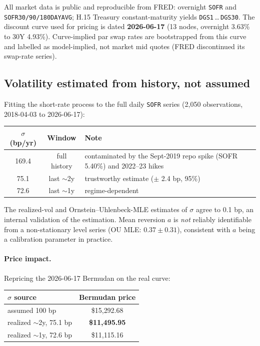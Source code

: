 \documentclass[11pt]{article}
\begin{document}
All market data is public and reproducible from FRED: overnight \texttt{SOFR} and
\texttt{SOFR30/90/180DAYAVG}; H.15 Treasury constant-maturity yields \texttt{DGS1}\,\ldots\,\texttt{DGS30}.
The discount curve used for pricing is dated \textbf{2026-06-17} (13 nodes, overnight
3.63\% to 30Y 4.93\%). Curve-implied par swap rates are bootstrapped from this curve and
labelled as model-implied, not market mid quotes (FRED discontinued its swap-rate series).

\subsection{Volatility estimated from history, not assumed}

Fitting the short-rate process to the full daily \texttt{SOFR} series (2{,}050 observations,
2018-04-03 to 2026-06-17):

\begin{center}
\begin{tabular}{ccl}
\toprule
$\sigma$ (bp/yr) & Window & Note \\
\midrule
169.4 & full history & contaminated by the Sept-2019 repo spike (SOFR 5.40\%) and 2022--23 hikes \\
75.1  & last $\sim$2y & trustworthy estimate ($\pm$ 2.4 bp, 95\%) \\
72.6  & last $\sim$1y & regime-dependent \\
\bottomrule
\end{tabular}
\end{center}

\noindent The realized-vol and Ornstein--Uhlenbeck-MLE estimates of $\sigma$ agree to
0.1 bp, an internal validation of the estimation. Mean reversion $a$ is \emph{not}
reliably identifiable from a non-stationary level series (OU MLE: $0.37 \pm 0.31$),
consistent with $a$ being a calibration parameter in practice.

\paragraph{Price impact.} Repricing the 2026-06-17 Bermudan on the real curve:

\begin{center}
\begin{tabular}{lc}
\toprule
$\sigma$ source & Bermudan price \\
\midrule
assumed 100 bp & \$15{,}292.68 \\
realized $\sim$2y, 75.1 bp & \textbf{\$11{,}495.95} \\
realized $\sim$1y, 72.6 bp & \$11{,}115.16 \\
\bottomrule
\end{tabular}
\end{center}
\end{document}
